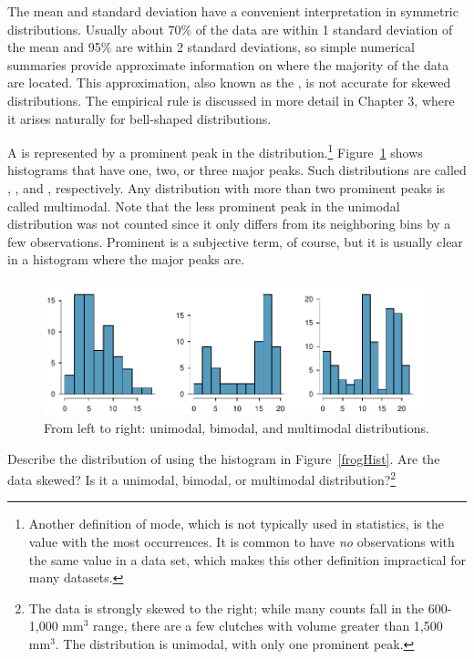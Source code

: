 The mean and standard deviation have a convenient interpretation in symmetric distributions.  Usually about 70\% of the data are within 1 standard deviation of the mean and 95\% are within 2 standard deviations, so simple numerical summaries provide approximate information on where the majority of the data are located.  This approximation, also known as the , is not accurate for skewed distributions.  The empirical rule is discussed in more detail in Chapter 3, where it arises naturally for bell-shaped distributions.

A  is represented by a prominent peak in the distribution.\footnote{Another definition of mode, which is not typically used in statistics, is the value with the most occurrences. It is common to have \emph{no} observations with the same value in a data set, which makes this other definition impractical for many datasets.} Figure~\ref{singleBiMultiModalPlots} shows histograms that have one, two, or three major peaks. Such distributions are called , , and , respectively. Any distribution with more than two prominent peaks is called multimodal. Note that the less prominent peak in the unimodal distribution was not counted since it only differs from its neighboring bins by a few observations. Prominent is a subjective term, of course, but it is usually clear in a histogram where the major peaks are.  


\begin{figure}[h]
	\centering
	\includegraphics[width=\textwidth]{ch_intro_to_data_oi_biostat/figures/singleBiMultiModalPlots/singleBiMultiModalPlots}
	\caption{From left to right: unimodal, bimodal, and multimodal distributions.}
	\label{singleBiMultiModalPlots}
\end{figure}

\begin{exercise}
	Describe the distribution of  using the histogram in Figure~\ref{frogHist}. Are the data skewed? Is it a unimodal, bimodal, or multimodal distribution?\footnote{The data is strongly skewed to the right; while many counts fall in the 600-1,000 $\textrm {mm}^{3}$ range, there are a few clutches with volume greater than 1,500 $\textrm {mm}^{3}$. The distribution is unimodal, with only one prominent peak.}
\end{exercise}


